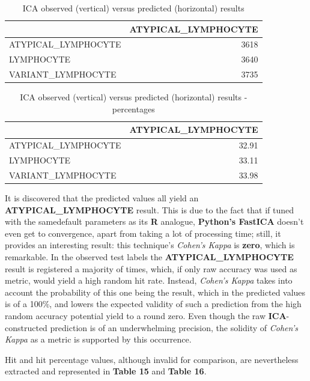 \documentclass[]{article}
\begin{document}
\begin{table}

\caption{\label{tab:results_table_2}ICA observed (vertical) versus predicted (horizontal) results}
\centering
\begin{tabular}[t]{l|r}
\hline
  & ATYPICAL\_LYMPHOCYTE\\
\hline
ATYPICAL\_LYMPHOCYTE & 3618\\
\hline
LYMPHOCYTE & 3640\\
\hline
VARIANT\_LYMPHOCYTE & 3735\\
\hline
\end{tabular}
\end{table}\begin{table}

\caption{\label{tab:results_perc_table_2}ICA observed (vertical) versus predicted (horizontal) results - percentages}
\centering
\begin{tabular}[t]{l|r}
\hline
  & ATYPICAL\_LYMPHOCYTE\\
\hline
ATYPICAL\_LYMPHOCYTE & 32.91\\
\hline
LYMPHOCYTE & 33.11\\
\hline
VARIANT\_LYMPHOCYTE & 33.98\\
\hline
\end{tabular}
\end{table}

It is discovered that the predicted values all yield an
\textbf{ATYPICAL\_LYMPHOCYTE} result. This is due to the fact that if
tuned with the samedefault parameters as its \textbf{R} analogue,
\textbf{Python's FastICA} doesn't even get to convergence, apart from
taking a lot of processing time; still, it provides an interesting
result: this technique's \emph{Cohen's Kappa} is \textbf{zero}, which is
remarkable. In the observed test labels the
\textbf{ATYPICAL\_LYMPHOCYTE} result is registered a majority of times,
which, if only raw accuracy was used as metric, would yield a high
random hit rate. Instead, \emph{Cohen's Kappa} takes into account the
probability of this one being the result, which in the predicted values
is of a 100\%, and lowers the expected validity of such a prediction
from the high random accuracy potential yield to a round zero. Even
though the raw \textbf{ICA}-constructed prediction is of an
underwhelming precision, the solidity of \emph{Cohen's Kappa} as a
metric is supported by this occurrence.

Hit and hit percentage values, although invalid for comparison, are
nevertheless extracted and represented in \textbf{Table 15} and
\textbf{Table 16}.
\end{document}
